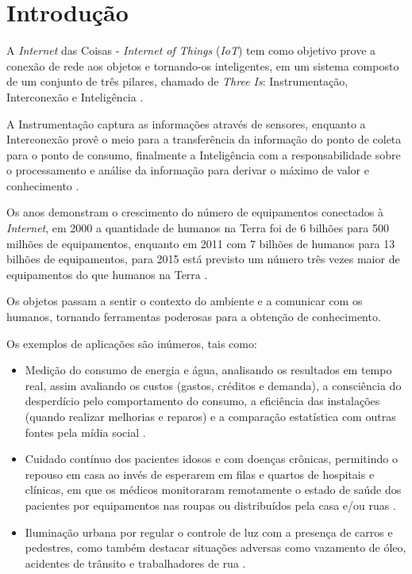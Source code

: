 %

\chapter{Introdução}

A \textit{Internet} das Coisas - \textit{Internet of Things} (\textit{IoT}) tem
como objetivo prove a conexão de rede aos objetos e tornando-os inteligentes,
em um sistema composto de um conjunto de três pilares, chamado de \textit{Three
  Is}: Instrumentação, Interconexão e Inteligência \cite{mqttibm2012}.

A Instrumentação captura as informações através de sensores, enquanto a
Interconexão provê o meio para a transferência da informação do ponto de coleta
para o ponto de consumo, finalmente a Inteligência com a responsabilidade sobre
o processamento e análise da informação para derivar o máximo de valor e
conhecimento \cite{mqttibm2012}.

Os anos demonstram o crescimento do número de equipamentos conectados à
\textit{Internet}, em 2000 a quantidade de humanos na Terra foi de 6 bilhões
para 500 milhões de equipamentos, enquanto em 2011 com 7 bilhões de humanos
para 13 bilhões de equipamentos, para 2015 está previsto um número três vezes
maior de equipamentos do que humanos na Terra \cite{mirkopresser2012}.

Os objetos passam a sentir o contexto do ambiente e a comunicar com os humanos,
tornando ferramentas poderosas para a obtenção de conhecimento.

Os exemplos de aplicações são inúmeros, tais como:

\begin{itemize}

    \item Medição do consumo de energia e água, analisando os resultados em
      tempo real, assim avaliando os custos (gastos, créditos e demanda), a
      consciência do desperdício pelo comportamento do consumo, a eficiência
      das instalações (quando realizar melhorias e reparos) e a comparação
      estatística com outras fontes pela mídia social \cite{mirkopresser2012}.

    \item Cuidado contínuo dos pacientes idosos e com doenças crônicas,
      permitindo o repouso em casa ao invés de esperarem em filas e quartos de
      hospitais e clínicas, em que os médicos monitoraram remotamente o estado
      de saúde dos pacientes por equipamentos nas roupas ou distribuídos pela
      casa e/ou ruas \cite{mirkopresser2012}.

    \item Iluminação urbana por regular o controle de luz com a presença de
      carros e pedestres, como também destacar situações adversas como
      vazamento de óleo, acidentes de trânsito e trabalhadores de rua
      \cite{mirkopresser2012}.

\end{itemize}


